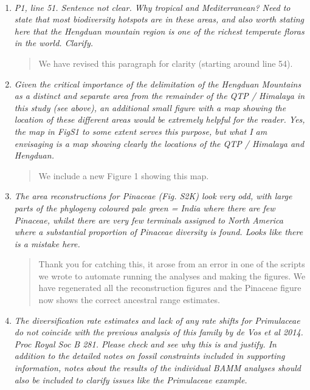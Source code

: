 \documentclass[11pt]{letter}
\begin{document}
\begin{letter}{ \\

}
\begin{enumerate}
  \begin{quote}
    This was an embarrassing oversight. We have added references here
    (line 51).
  \end{quote}

\item \textit{P1, line 51. Sentence not clear. Why tropical and
    Mediterranean? Need to state that most biodiversity hotspots are
    in these areas, and also worth stating here that the Hengduan
    mountain region is one of the richest temperate floras in the
    world. Clarify.}

  \begin{quote}
    We have revised this paragraph for clarity (starting around line
    54).
  \end{quote}

\item \textit{Given the critical importance of the delimitation of the
    Hengduan Mountains as a distinct and separate area from the
    remainder of the QTP / Himalaya in this study (see above), an
    additional small figure with a map showing the location of these
    different areas would be extremely helpful for the reader. Yes,
    the map in FigS1 to some extent serves this purpose, but what I am
    envisaging is a map showing clearly the locations of the QTP /
    Himalaya and Hengduan.}

  \begin{quote}
    We include a new Figure 1 showing this map.
  \end{quote}

\item \textit{The area reconstructions for Pinaceae (Fig. S2K) look
    very odd, with large parts of the phylogeny coloured pale green =
    India where there are few Pinaceae, whilst there are very few
    terminals assigned to North America where a substantial proportion
    of Pinaceae diversity is found. Looks like there is a mistake
    here.}

  \begin{quote}
    Thank you for catching this, it arose from an error in one of the
    scripts we wrote to automate running the analyses and making the
    figures. We have regenerated all the reconstruction figures and
    the Pinaceae figure now shows the correct ancestral range
    estimates.
  \end{quote}

\item \textit{The diversification rate estimates and lack of any rate
    shifts for Primulaceae do not coincide with the previous analysis
    of this family by de Vos et al 2014. Proc Royal Soc B 281. Please
    check and see why this is and justify. In addition to the detailed
    notes on fossil constraints included in supporting information,
    notes about the results of the individual BAMM analyses should
    also be included to clarify issues like the Primulaceae example.}


\end{enumerate}
\end{letter}
\end{document}

